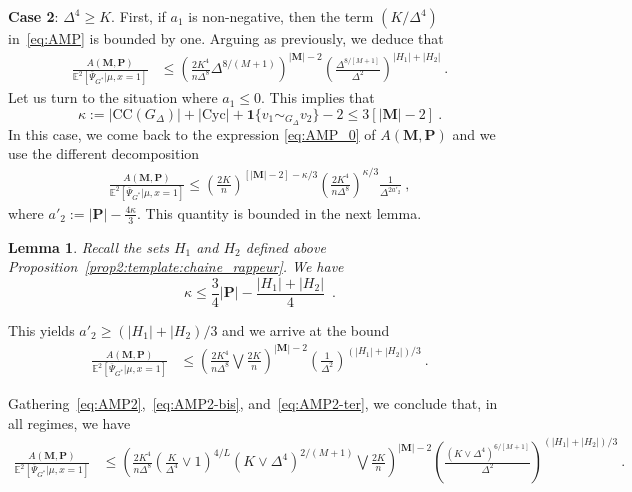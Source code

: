 \documentclass{article}
\newtheorem{lemma}{Lemma}
\begin{document}
\noindent 
{\bf Case 2}: $\Delta^4 \geq K$. First, if $a_1$ is non-negative, then the term $(K/\Delta^{4})$ in~\eqref{eq:AMP} is bounded by one. Arguing as previously, we deduce that 
\begin{align}
    \frac{A(\mathbf{M},\mathbf{P})}{\mathbb E^2[\overline{\Psi}_{G^*}|\mu,x=1]}
&\leq \left(\frac{2K^4}{n\Delta^8} \Delta^{8/(M+1)} \right)^{|\mathbf{M}|-2}  \left(\frac{\Delta^{8/[M+1]}}{\Delta^{2}} \right)^{|H_1|+|H_2|}
\label{eq:AMP2-bis} \ . 
\end{align}
Let us turn to the situation where $a_1\leq 0$. This implies that 
\[
\kappa := |\mathrm{CC}(G_{\Delta})| + |\mathrm{Cyc}|+\mathbf{1}\{v_1 \sim_{G_\Delta} v_2\}- 2 \leq 3[|\mathbf{M}|-2]\ . 
\]
In this case, we come back to the expression \eqref{eq:AMP_0} of $A(\mathbf{M},\mathbf{P})$ and we use the different decomposition 
\begin{align}\nonumber
\frac{A(\mathbf{M},\mathbf{P})}{\mathbb E^2[\overline{\Psi}_{G^*}|\mu,x=1]} 
\leq \left(\frac{2K}{n}\right)^{[|\mathbf{M}|-2]-\kappa/3} \left(\frac{2K^4}{n\Delta^8}\right)^{\kappa/3} \frac{1}{\Delta^{2a'_2}} \ ,  \label{eq:AMP_0_bis}
\end{align}
where $a'_2:= |\mathbf{P}|-\frac{4\kappa}{3}$.  This quantity is bounded in the next lemma.
\begin{lemma}\label{lem:P:petit}
Recall the sets $H_1$ and $H_2$ defined above Proposition~\ref{prop2:template:chaine_rappeur}. We have 
\[
\kappa \leq \frac{3}{4}|\mathbf{P}| - \frac{|H_1|+|H_2|}{4}\enspace . 
\]
\end{lemma}
This yields $a'_2\geq (|H_1|+|H_2)/3$ and we arrive at the bound   
\begin{align}
    \frac{A(\mathbf{M},\mathbf{P})}{\mathbb E^2[\overline{\Psi}_{G^*}|\mu,x=1]}
&\leq \left(\frac{2K^4}{n\Delta^8} \bigvee \frac{2K}{n} \right)^{|\mathbf{M}|-2}  \left(\frac{1}{\Delta^{2}} \right)^{(|H_1|+|H_2|)/3}
\label{eq:AMP2-ter} \ . 
\end{align}


Gathering~\eqref{eq:AMP2},~\eqref{eq:AMP2-bis}, and~\eqref{eq:AMP2-ter}, we conclude that, in all regimes,  we have 
\begin{align}
    \frac{A(\mathbf{M},\mathbf{P})}{\mathbb E^2[\overline{\Psi}_{G^*}|\mu,x=1]}
&\leq \left(\frac{2K^4}{n\Delta^8} \left(\frac{K}{\Delta^4}\vee 1 \right)^{4/L}(K\vee \Delta^4)^{2/(M+1)}\bigvee \frac{2K}{n} \right)^{|\mathbf{M}|-2}  \left(\frac{(K\vee \Delta^4)^{6/[M+1]}}{\Delta^{2}} \right)^{(|H_1|+|H_2|)/3}
\label{eq:AMP2_final} \ . 
\end{align}
\end{document}
